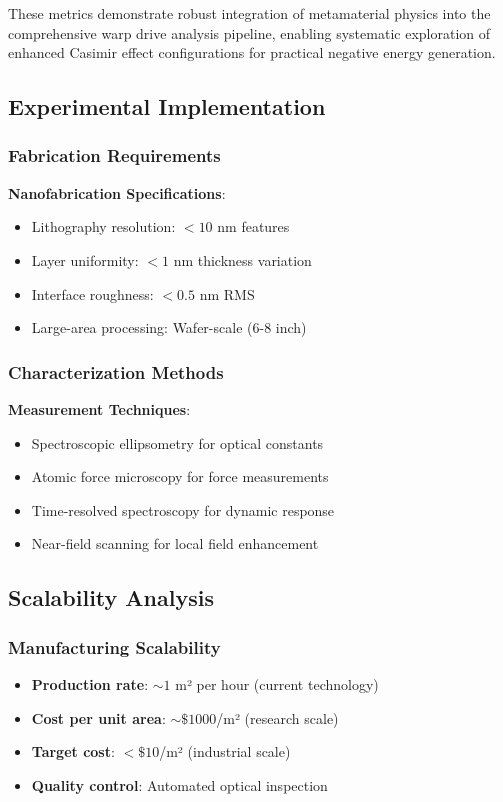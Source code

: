 These metrics demonstrate robust integration of metamaterial physics into the comprehensive warp drive analysis pipeline, enabling systematic exploration of enhanced Casimir effect configurations for practical negative energy generation.

\subsection{Experimental Implementation}

\subsubsection{Fabrication Requirements}

\textbf{Nanofabrication Specifications}:
\begin{itemize}
\item Lithography resolution: $< 10$ nm features
\item Layer uniformity: $< 1$ nm thickness variation
\item Interface roughness: $< 0.5$ nm RMS
\item Large-area processing: Wafer-scale (6-8 inch)
\end{itemize}

\subsubsection{Characterization Methods}

\textbf{Measurement Techniques}:
\begin{itemize}
\item Spectroscopic ellipsometry for optical constants
\item Atomic force microscopy for force measurements
\item Time-resolved spectroscopy for dynamic response
\item Near-field scanning for local field enhancement
\end{itemize}

\subsection{Scalability Analysis}

\subsubsection{Manufacturing Scalability}

\begin{itemize}
\item \textbf{Production rate}: $\sim 1$ m² per hour (current technology)
\item \textbf{Cost per unit area}: $\sim \$1000$/m² (research scale)
\item \textbf{Target cost}: $< \$10$/m² (industrial scale)
\item \textbf{Quality control}: Automated optical inspection
\end{itemize}

